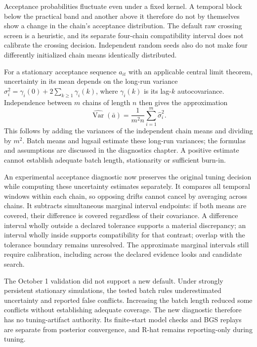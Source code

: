 \documentclass{article}
\begin{document}
Acceptance probabilities fluctuate even under a fixed kernel. A temporal block
below the practical band and another above it therefore do not by themselves
show a change in the chain's acceptance distribution. The default raw crossing
screen is a heuristic, and its separate four-chain compatibility interval does
not calibrate the crossing decision. Independent random seeds also do not make
four differently initialized chain means identically distributed.

For a stationary acceptance sequence $a_{it}$ with an applicable central limit
theorem, uncertainty in its mean depends on the long-run variance
$\sigma_i^2=\gamma_i(0)+2\sum_{k\geq1}\gamma_i(k)$, where $\gamma_i(k)$ is
its lag-$k$ autocovariance. Independence between $m$ chains of length $n$
then gives the approximation
\[
 \widehat{\operatorname{Var}}(\bar a)
 = \frac{1}{m^2 n}\sum_{i=1}^{m}\widehat\sigma_i^2.
\]
This follows by adding the variances of the independent chain means and
dividing by $m^2$. Batch means and lugsail estimate these long-run variances;
the formulas and assumptions are discussed in the diagnostics chapter. A
positive estimate cannot establish adequate batch length, stationarity or
sufficient burn-in.

An experimental acceptance diagnostic now preserves the original tuning
decision while computing these uncertainty estimates separately. It compares
all temporal windows within each chain, so opposing drifts cannot cancel by
averaging across chains. It subtracts simultaneous marginal interval endpoints:
if both means are covered, their difference is covered regardless of their
covariance. A difference interval wholly outside a declared tolerance supports
a material discrepancy; an interval wholly inside supports compatibility for
that contrast; overlap with the tolerance boundary remains unresolved. The
approximate marginal intervals still require calibration, including across
the declared evidence looks and candidate search.

The October 1 validation did not support a new default. Under strongly
persistent stationary simulations, the tested batch rules underestimated
uncertainty and reported false conflicts. Increasing the batch length reduced
some conflicts without establishing adequate coverage. The new diagnostic
therefore has no tuning-artifact authority. Its finite-start model checks and
BGS replays are separate from posterior convergence, and R-hat remains
reporting-only during tuning.
\end{document}
